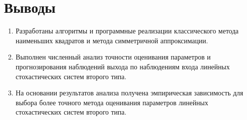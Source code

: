 \section{Выводы}

\begin{enumerate}
\item Разработаны алгоритмы и программные реализации классического
  метода наименьших квадратов и метода симметричной аппроксимации.
\item Выполнен численный анализ точности оценивания параметров и
  прогнозирования наблюдений выхода по наблюдениям входа линейных
  стохастических систем второго типа.
\item На основании результатов анализа получена эмпирическая зависимость
  для выбора более точного метода оценивания параметров линейных стохастических
  систем второго типа.
\end{enumerate}
